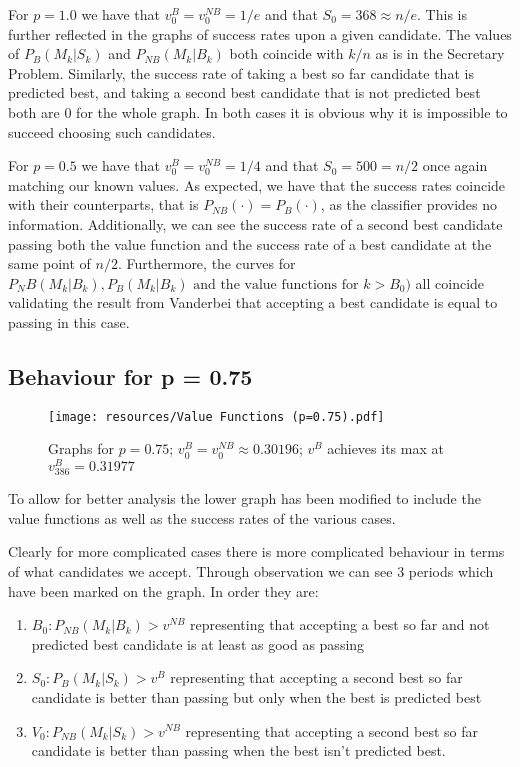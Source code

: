 \documentclass[a4paper,11pt]{article}
\begin{document}
For $p = 1.0$ we have that $v^B_0 = v^{NB}_0 = 1/e$ and that $S_0 = 368 \approx n/e$. This is further reflected in the graphs of success rates upon a given candidate. The values of $P_B(M_k|S_k)$ and $P_{NB}(M_k|B_k)$ both coincide with $k/n$ as is in the Secretary Problem. Similarly, the success rate of taking a best so far candidate that is predicted best, and taking a second best candidate that is not predicted best both are 0 for the whole graph. In both cases it is obvious why it is impossible to succeed choosing such candidates.

For $p = 0.5$ we have that $v^B_0 = v^{NB}_0 = 1/4$ and that $S_0 = 500 = n/2$ once again matching our known values. As expected, we have that the success rates coincide with their counterparts, that is $P_{NB}(\cdot) =P_B({\cdot})$, as the classifier provides no information. Additionally, we can see the success rate of a second best candidate passing both the value function and the success rate of a best candidate at the same point of $n/2$. Furthermore, the curves for $P_NB(M_k|B_k), P_B(M_k|B_k) \text{ and the value functions for } k > B_0)$ all coincide validating the result from Vanderbei \cite{vanderbei2011postdoc}  that accepting a best candidate is equal to passing in this case.
\subsection{Behaviour for p = 0.75}
\label{sec:graph}


\begin{figure}[H] 
    \centering
\texttt{[image: resources/Value Functions (p=0.75).pdf]}
    \caption{Graphs for $p = 0.75$; $v^B_0 = v_0^{NB}\approx0.30196$; $v^B$ achieves its max at $v^B_{386} = 0.31977$}
    \label{fig:value p = 0.75} 
\end{figure}

To allow for better analysis the lower graph has been modified to include the value functions as well as the success rates of the various cases.

Clearly for more complicated cases there is more complicated behaviour in terms of what candidates we accept. Through observation we can see 3 periods which have been marked on the graph. In order they are:
\begin{enumerate}
    \item $B_0: P_{NB}(M_k|B_k) > v^{NB}$ representing that accepting a best so far and not predicted best candidate is at least as good as passing
    \item $S_0: P_B(M_k|S_k) > v^{B}$ representing that accepting a second best so far candidate is better than passing but only when the best is predicted best
    \item $V_0: P_{NB}(M_k|S_k) > v^{NB}$ representing that accepting a second best so far candidate is better than passing when the best isn't predicted best.
\end{enumerate}
\end{document}
